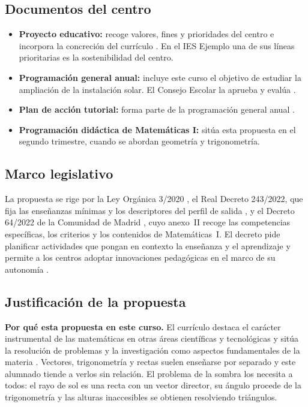 \subsection{Documentos del centro}
\begin{itemize}
  \item \textbf{Proyecto educativo:} recoge valores, fines y prioridades del centro e incorpora la concreción del currículo \parencite[art.~121.1, p.~122921]{lomloe}. En el IES Ejemplo una de sus líneas prioritarias es la sostenibilidad del centro.
  \item \textbf{Programación general anual:} incluye este curso el objetivo de estudiar la ampliación de la instalación solar. El Consejo Escolar la aprueba y evalúa \parencite[art.~127.b, p.~122923]{lomloe}.
  \item \textbf{Plan de acción tutorial:} forma parte de la programación general anual \parencite[art.~5.3, p.~17]{decreto64}.
  \item \textbf{Programación didáctica de Matemáticas I:} sitúa esta propuesta en el segundo trimestre, cuando se abordan geometría y trigonometría.
\end{itemize}

\subsection{Marco legislativo}
La propuesta se rige por la Ley Orgánica 3/2020 \parencite{lomloe}, el Real Decreto 243/2022, que fija las enseñanzas mínimas y los descriptores del perfil de salida \parencite{rd243}, y el Decreto 64/2022 de la Comunidad de Madrid \parencite{decreto64}, cuyo anexo~II recoge las competencias específicas, los criterios y los contenidos de Matemáticas~I. El decreto pide planificar actividades que pongan en contexto la enseñanza y el aprendizaje \parencite[art.~16.3, p.~21]{decreto64} y permite a los centros adoptar innovaciones pedagógicas en el marco de su autonomía \parencite[art.~19.3.a, pp.~21--22]{decreto64}.

\subsection{Justificación de la propuesta}
\textbf{Por qué esta propuesta en este curso.} El currículo destaca el carácter instrumental de las matemáticas en otras áreas científicas y tecnológicas y sitúa la resolución de problemas y la investigación como aspectos fundamentales de la materia \parencite[p.~320]{decreto64}. Vectores, trigonometría y rectas suelen enseñarse por separado y este alumnado tiende a verlos sin relación. El problema de la sombra los necesita a todos: el rayo de sol es una recta con un vector director, su ángulo procede de la trigonometría y las alturas inaccesibles se obtienen resolviendo triángulos.

